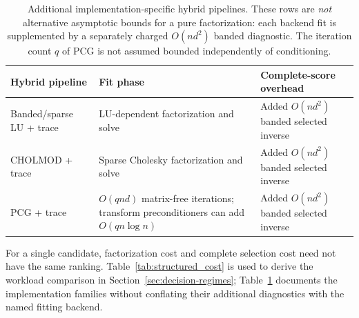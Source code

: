 \begin{table}[tbp]
\centering
\caption{Additional implementation-specific hybrid pipelines.
These rows are \emph{not} alternative asymptotic bounds
for a pure factorization: each backend fit is supplemented by
a separately charged $O(nd^2)$ banded diagnostic. The iteration
count $q$ of PCG is not assumed bounded independently of conditioning.}
\label{tab:structured_hybrids}
\small
\renewcommand{\arraystretch}{1.16}
\setlength{\tabcolsep}{5pt}
\begin{tabularx}{\textwidth}{@{}p{}p{}X@{}}
\toprule
Hybrid pipeline & Fit phase & Complete-score overhead\\
\midrule
Banded/sparse LU + trace
& LU-dependent factorization and solve
& Added $O(nd^2)$ banded selected inverse\\
CHOLMOD + trace
& Sparse Cholesky factorization and solve
& Added $O(nd^2)$ banded selected inverse\\
PCG + trace
& $O(qnd)$ matrix-free iterations; transform
preconditioners can add $O(qn\log n)$
& Added $O(nd^2)$ banded selected inverse\\
\bottomrule
\end{tabularx}
\end{table}

For a single candidate, factorization cost and complete selection
cost need not have the same ranking. Table~\ref{tab:structured_cost}
is used to derive the workload comparison in
Section~\ref{sec:decision-regimes}; Table~\ref{tab:structured_hybrids}
documents the implementation families without conflating their
additional diagnostics with the named fitting backend.
